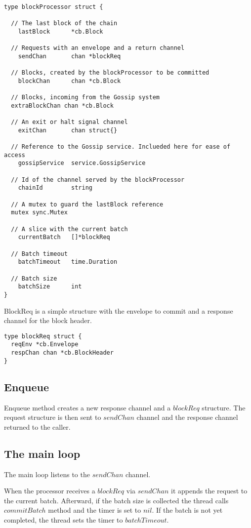 \begin{lstlisting}
type blockProcessor struct {

  // The last block of the chain
	lastBlock      *cb.Block

  // Requests with an envelope and a return channel
	sendChan       chan *blockReq

  // Blocks, created by the blockProcessor to be committed
	blockChan      chan *cb.Block

  // Blocks, incoming from the Gossip system
  extraBlockChan chan *cb.Block

  // An exit or halt signal channel
	exitChan       chan struct{}

  // Reference to the Gossip service. Inclueded here for ease of access
	gossipService  service.GossipService

  // Id of the channel served by the blockProcessor
	chainId        string

  // A mutex to guard the lastBlock reference
  mutex sync.Mutex

  // A slice with the current batch
	currentBatch   []*blockReq

  // Batch timeout
	batchTimeout   time.Duration

  // Batch size
	batchSize      int
}
\end{lstlisting}

\newpage
BlockReq is a simple structure with the envelope to commit and a response channel for the block header.

\begin{lstlisting}
type blockReq struct {
  reqEnv *cb.Envelope
  respChan chan *cb.BlockHeader
}
\end{lstlisting}

\subsection*{Enqueue}

Enqueue method creates a new response channel and a $blockReq$ structure. The request structure is then sent to $sendChan$ channel and the response channel returned to the caller.

\subsection*{The main loop}

The main loop listens to the $sendChan$ channel.

When the processor receives a $blockReq$ via $sendChan$ it appends the request to the current batch. Afterward, if the batch size is collected the thread calls $commitBatch$ method and the timer is set to $nil$. If the batch is not yet completed, the thread sets the timer to $batchTimeout$.

